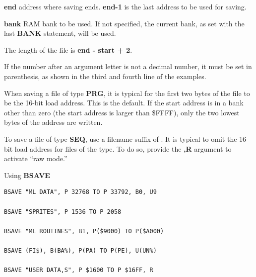 \begin{description}[leftmargin=2cm,style=nextline]
                  {\bf end} address where saving ends. {\bf end-1} is the last address to be used for saving.

                  {\bf bank} RAM bank to be used. If not specified, the current bank, as set with the last {\bf BANK} statement, will be used.

                  \drivedefinition

                  \unitdefinition

\item [Remarks:]  The length of the file is {\bf end - start + 2}.

                  If the number after an argument letter is not a decimal number, it must be set in parenthesis, as shown in the third and fourth line of the examples.

                  When saving a file of type {\bf PRG}, it is typical for the first two bytes of the file to be the 16-bit load address. This is the default. If the start address is in a bank other than zero (the start address is larger than \$FFFF), only the two lowest bytes of the address are written.

                  To save a file of type {\bf SEQ}, use a filename suffix of . It is typical to omit the 16-bit load address for files of the type. To do so, provide the {\bf ,R} argument to activate ``raw mode.''

\item [Examples:] Using {\bf BSAVE}

\begin{tcolorbox}[colback=black,coltext=white]
\verbatimfont{\codefont}
\begin{verbatim}
BSAVE "ML DATA", P 32768 TO P 33792, B0, U9

BSAVE "SPRITES", P 1536 TO P 2058

BSAVE "ML ROUTINES", B1, P($9000) TO P($A000)

BSAVE (FI$), B(BA%), P(PA) TO P(PE), U(UN%)

BSAVE "USER DATA,S", P $1600 TO P $16FF, R
\end{verbatim}
\end{tcolorbox}
\end{description}


\newpage
